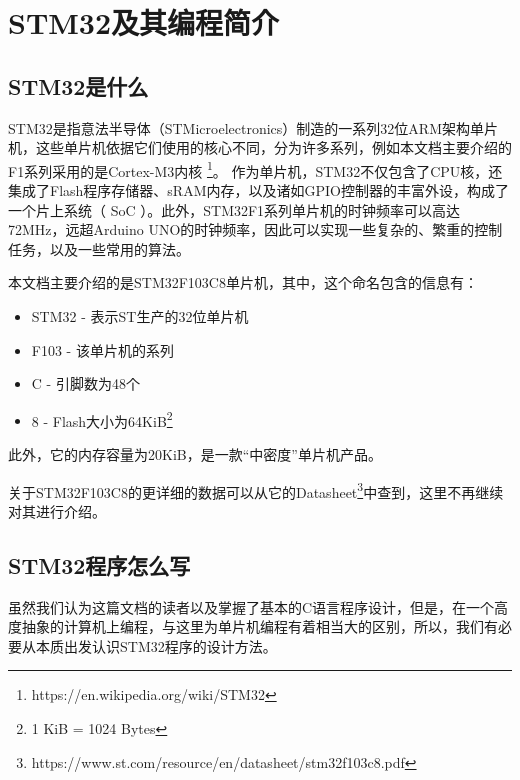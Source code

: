 \renewenvironment{longtable}{\rowcolors{2}{LightGray}{white}\oldlongtable} {\endoldlongtable}
\chapter{STM32及其编程简介}

\section{STM32是什么}
STM32是指意法半导体（STMicroelectronics）制造的一系列32位ARM架构单片机，这些单片机依据它们使用的核心不同，分为许多系列，例如本文档主要介绍的F1系列采用的是Cortex-M3内核 \footnote{https://en.wikipedia.org/wiki/STM32}。
作为单片机，STM32不仅包含了CPU核，还集成了Flash程序存储器、sRAM内存，以及诸如GPIO控制器的丰富外设，构成了一个片上系统（
\ac{SoC}
）。此外，STM32F1系列单片机的时钟频率可以高达72MHz，远超Arduino UNO的时钟频率，因此可以实现一些复杂的、繁重的控制任务，以及一些常用的算法。
\par 
本文档主要介绍的是STM32F103C8单片机，其中，这个命名包含的信息有：
\begin{itemize}
	\item STM32 - 表示ST生产的32位单片机
	\item F103 - 该单片机的系列
	\item C - 引脚数为48个
	\item 8 - Flash大小为64KiB\footnote{1 KiB = 1024 Bytes}
\end{itemize}
此外，它的内存容量为20KiB，是一款“中密度”单片机产品。
\par 
关于STM32F103C8的更详细的数据可以从它的Datasheet\footnote{https://www.st.com/resource/en/datasheet/stm32f103c8.pdf}中查到，这里不再继续对其进行介绍。

\section{STM32程序怎么写}
虽然我们认为这篇文档的读者以及掌握了基本的C语言程序设计，但是，在一个高度抽象的计算机上编程，与这里为单片机编程有着相当大的区别，所以，我们有必要从本质出发认识STM32程序的设计方法。
